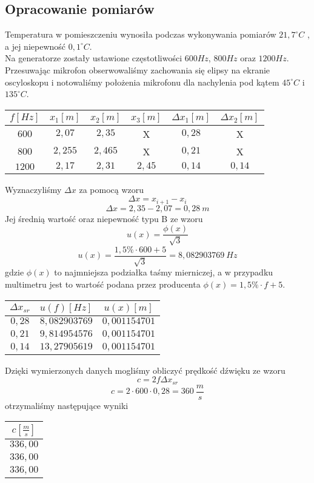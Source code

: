 \documentclass{article}
\begin{document}
\subsection{Opracowanie pomiarów}
Temperatura w pomieszczeniu wynosiła podczas wykonywania pomiarów $21,7^{\circ}C$ , a jej niepewność $0,1^{\circ}C$.\\
Na generatorze zostały ustawione częstotliwości $600Hz$, $800Hz$ oraz $1200Hz$. Przesuwając mikrofon obserwowaliśmy zachowania się elipsy na ekranie oscyloskopu i notowaliśmy położenia mikrofonu dla nachylenia pod kątem $45^{\circ}C$ i $135^{\circ}C$.

\begin{center}
    \begin{tabular}{|c|c|c|c|c|c|}
    \hline
    $f[Hz]$ & $x_1 [m]$ & $x_2 [m]$ & $x_3 [m]$ & $\Delta x_1 [m]$ & $\Delta x_2 [m]$\\ \hline
    $600$ & $2,07$ & $2,35$ & X & $0,28$ & X\\ \hline
    $800$ & $2,255$ & $2,465$ & X & $0,21$ & X\\ \hline
    $1200$ & $2,17$ & $2,31$ & $2,45$ & $0,14$ & $0,14$\\ \hline
    \end{tabular}
\end{center}
Wyznaczyliśmy $\Delta x$ za pomocą wzoru 
$$\Delta x = x_{i+1} - x_i$$
$$\Delta x = 2,35 - 2,07 = 0,28\ m$$
Jej średnią wartość oraz niepewność typu B ze wzoru
$$u(x) = \frac{\phi (x)}{\sqrt{3}}$$
$$u(x) = \frac{1,5\% \cdot 600 + 5}{\sqrt{3}} = 8,082903769\ Hz $$
gdzie $\phi (x)$ to najmniejsza podziałka taśmy mierniczej, a w przypadku multimetru jest to wartość podana przez producenta $\phi (x) = 1,5\% \cdot f + 5$.
\begin{center}
    \begin{tabular}{|c|c|c|}
    \hline
    $\Delta x_{sr}$ & $u(f) [Hz]$ & $u(x) [m]$ \\ \hline
    $0,28$ & $8,082903769$ & $0,001154701$ \\ \hline
    $0,21$ & $9,814954576$ & $0,001154701$ \\ \hline
    $0,14$ & $13,27905619$ & $0,001154701$ \\ \hline    
    \end{tabular}
\end{center}
Dzięki wymierzonych danych mogliśmy obliczyć prędkość dźwięku ze wzoru
$$ c = 2f\Delta x_{sr} $$
$$ c = 2 \cdot 600 \cdot 0,28 = 360\ \frac{m}{s}$$
otrzymaliśmy następujące wyniki
\begin{center}
    \begin{tabular}{|c|}
    \hline
    $c [\frac{m}{s}]$ \\ \hline
    $336,00$\\ \hline
    $336,00$\\ \hline
    $336,00$\\ \hline    
    \end{tabular}
\end{center}
\end{document}
